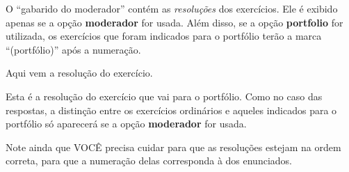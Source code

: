 \documentclass[a4paper]{article}
\newcommand\code[1]{\textbf{#1}}
\begin{document}
  \begin{resolucoes}

    O ``gabarido do moderador'' contém as \emph{resoluções} dos exercícios.
    Ele é exibido apenas se a opção \code{moderador} for usada.  
    Além disso, se a opção \code{portfolio} for utilizada, os exercícios que foram indicados para o portfólio
    terão a marca ``(portfólio)'' após a numeração.

    \begin{exercicio}
      Aqui vem a resolução do exercício.
    \end{exercicio}
    
    \begin{exercicio*}
      Esta é a resolução do exercício que vai para o portfólio.
      Como no caso das respostas, a distinção entre os exercícios ordinários e aqueles indicados para o portfólio só aparecerá se a opção \code{moderador} for usada. 
    \end{exercicio*}

    \begin{exercicio}
      Note ainda que VOCÊ precisa cuidar para que as resoluções estejam na ordem correta,
      para que a numeração delas corresponda à dos enunciados.
    \end{exercicio}

  \end{resolucoes}
\end{document}
